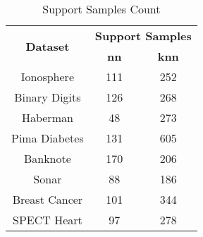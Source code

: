 \begin{table}[htbp]
\caption{Support Samples Count}
\begin{center}
\begin{tabular}{|c|c|c|}
\hline
\multirow{2}{*}{\textbf{Dataset}} & \multicolumn{2}{c|}{\textbf{Support Samples}} \\ \cline{2-3}
 & \textbf{nn} & \textbf{knn} \\ \hline
Ionosphere & 111 & 252 \\ \hline
Binary Digits & 126 & 268 \\ \hline
Haberman & 48 & 273 \\ \hline
Pima Diabetes & 131 & 605 \\ \hline
Banknote & 170 & 206 \\ \hline
Sonar & 88 & 186 \\ \hline
Breast Cancer & 101 & 344 \\ \hline
SPECT Heart & 97 & 278 \\ \hline
\end{tabular}
\label{tab:support}
\end{center}
\end{table}